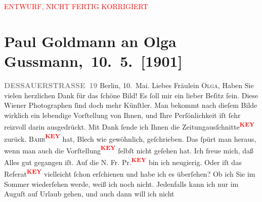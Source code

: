 
\begin{center}
            \textcolor{red}{ENTWURF, NICHT FERTIG KORRIGIERT}
                      \end{center}
            
         
         \renewcommand{\erwaehntePersonen}{Personen: Olga Schnitzler}
         \renewcommand{\erwaehnteOrte}{Orte: Berlin, Wien}
         \renewcommand{\erwaehnteWerke}{}
               \section[ Paul Goldmann an Olga Gussmann, 10. 5. {[}1901{]}]{ Paul Goldmann an Olga Gussmann, 10. 5. {[}1901{]}}\nopagebreak{}\rehead{ }\begin{ledgroupsized}[t]{13cm}\normalsize\beginnumbering \toendnotes[C]{\smallbreak\pagebreak[2]} 
\pstart
           \noindent{}\raggedleft{}{\pb}\textcolor{gray}{\textbf{DESSAUERSTRASSE 19}}\pend
           \pstart
           Berlin, 10. Mai.\pend
           \pstart\center{}Liebes Fräulein \textsc{Olga},\pend\pstart
           Haben Sie vielen herzlichen Dank für das ſchöne Bild! Es ſoll mir ein lieber Beſitz
               ſein. Diese Wiener Photographen ſind doch mehr
               Künſtler. Man bekommt nach dieſem Bilde wirklich ein lebendige Vorſtellung von Ihnen,
               und Ihre Perſönlichkeit iſt ſehr reizvoll darin ausgedrückt.\pend
           \pstart
           Mit Dank ſende ich Ihnen die Zeitungausſchnitte\textcolor{red}{\textsuperscript{\textbf{KEY}}} zurück.
                  \textsc{Bahr\textcolor{red}{\textsuperscript{\textbf{KEY}}}} hat, {\pb}Blech wie gewöhnlich,  geſchrieben.
               Das ſpürt man heraus, wenn man auch die Vorſtellung\textcolor{red}{\textsuperscript{\textbf{KEY}}}
               ſelbſt nicht geſehen hat. Ich freue mich, daß Alles gut gegangen iſt. Auf die N. Fr. Pr.\textcolor{red}{\textsuperscript{\textbf{KEY}}} bin ich neugierig. Oder iſt das Referat\textcolor{red}{\textsuperscript{\textbf{KEY}}} vielleicht ſchon erſchienen und habe ich es überſehen?\pend
           \pstart
           Ob ich Sie im Sommer wiederſehen werde, weiß ich noch nicht. Jedenfalls kann ich nur
               im Auguſt auf Urlaub gehen, {\pb} und auch dann will ich nicht

\end{ledgroupsized}
